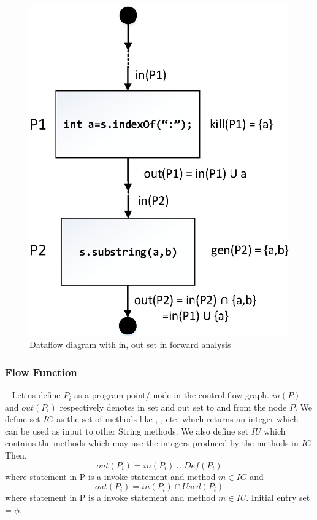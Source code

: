 {\begin{figure}[t]
\centering
\includegraphics[scale=.30]{images/dataflow.png}
\caption{Dataflow diagram with in, out set in forward analysis}
\label{fig:dataflow}
\end{figure}

\subsubsection{Flow Function}
\label{subsubsec:flowFunction}

~\newline
Let us define $P_i$ as a program point/ node in the control flow graph. $in(P)$
and $out(P_i)$ respectively denotes in set and out set to and from the node $P$.
We define set $IG$ as the set of methods like ,
,  etc. which returns an integer
which can be used as input to other String methods. We also define set $IU$
which contains the methods which may use the integers produced by the methods in
$IG$ Then, 
$$out(P_i) = in(P_i) \cup Def(P_i)$$ where statement in P is a invoke statement
and method $m \in IG$ and
$$out(P_i) = in(P_i) \cap Used(P_i)$$ where statement in P is a invoke statement
and method $m \in IU$. Initial entry set = ${\phi}$.


}
